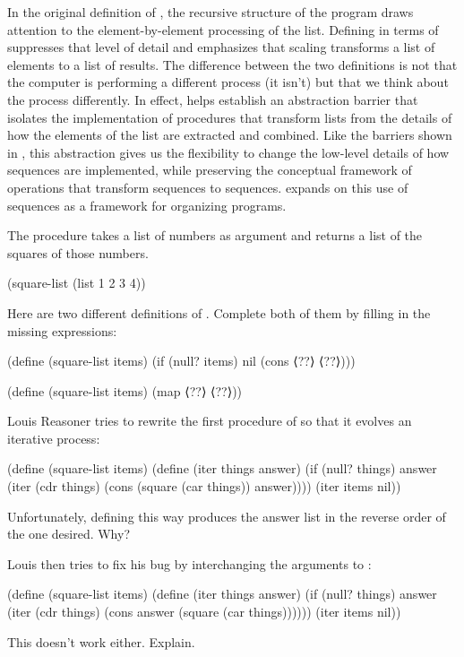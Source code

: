 In the original definition of , the recursive structure of the program draws attention to the element-by-element processing of the list.
Defining  in terms of  suppresses that level of detail and emphasizes that scaling transforms a list of elements to a list of results.
The difference between the two definitions is not that the computer is performing a different process (it isn’t) but that we think about the process differently.
In effect,  helps establish an abstraction barrier that isolates the implementation of procedures that transform lists from the details of how the elements of the list are extracted and combined.
Like the barriers shown in , this abstraction gives us the flexibility to change the low-level details of how sequences are implemented, while preserving the conceptual framework of operations that transform sequences to sequences.
 expands on this use of sequences as a framework for organizing programs.



\begin{exercise}
	\label{Exercise 2.21}
	The procedure  takes a list of numbers as argument and returns a list of the squares of those numbers.
	\begin{scheme}
	  (square-list (list 1 2 3 4))
	  ~~
	\end{scheme}
	Here are two different definitions of \code{square-list}.
	Complete both of them by filling in the missing expressions:
	\begin{scheme}
	  (define (square-list items)
	    (if (null? items)
	        nil
	        (cons ⟨??⟩ ⟨??⟩)))

	  (define (square-list items)
	    (map ⟨??⟩ ⟨??⟩))
	\end{scheme}
\end{exercise}



\begin{exercise}
	\label{Exercise 2.22}
	Louis Reasoner tries to rewrite the first  procedure of  so that it evolves an iterative process:
	\begin{scheme}
	  (define (square-list items)
	    (define (iter things answer)
	      (if (null? things)
	          answer
	          (iter (cdr things)
	                (cons (square (car things))
	                      answer))))
	    (iter items nil))
	\end{scheme}
	Unfortunately, defining  this way produces the answer list in the reverse order of the one desired.
	Why?

	Louis then tries to fix his bug by interchanging the arguments to \code{cons}:
	\begin{scheme}
	  (define (square-list items)
	    (define (iter things answer)
	      (if (null? things)
	          answer
	          (iter (cdr things)
	                (cons answer
	                      (square (car things))))))
	    (iter items nil))
	\end{scheme}
	This doesn’t work either.
	Explain.
\end{exercise}



